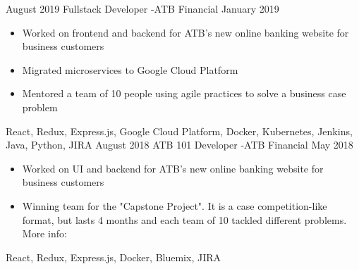 
\begin{experiences}
  \experience
    {August 2019}   {Fullstack Developer -}{ATB Financial}{}
    {January 2019} {
                      \begin{itemize}
                        \item Worked on frontend and backend for ATB's new online banking website for business customers
                        \item Migrated microservices to Google Cloud Platform
                        \item Mentored a team of 10 people using agile practices to solve a business case problem
                      \end{itemize}
                    }
                    {
                        React,
                        Redux,
                        Express.js,
                        Google Cloud Platform,
                        Docker,
                        Kubernetes,
                        Jenkins,
                        Java,
                        Python,
                        JIRA
                    }
  \emptySeparator
  \experience
  {August 2018}   {ATB 101 Developer -}{ATB Financial}{}
  {May 2018} {
                    \begin{itemize}
                      \item Worked on UI and backend for ATB's new online banking website for business customers
                      \item Winning team for the "Capstone Project". It is a case competition-like format,
                      but lasts 4 months and each team of 10 tackled different problems.
                      More info: 
                    \end{itemize}
                  }
                  {
                      React,
                      Redux,
                      Express.js,
                      Docker,
                      Bluemix,
                      JIRA
                  }
\end{experiences}
